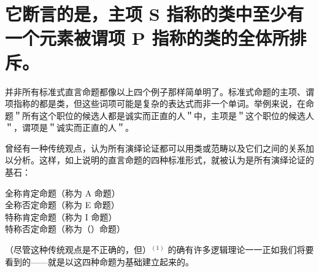 \section*{它断言的是，主项 $\boldsymbol{S}$ 指称的类中至少有一个元素被谓项 $\boldsymbol{P}$ 指称的类的全体所排斥。}
并非所有标准式直言命题都像以上四个例子那样简单明了。标准式命题的主项、谓项指称的都是类，但这些词项可能是复杂的表达式而非一个单词。举例来说，在命题＂所有这个职位的候选人都是诚实而正直的人＂中，主项是＂这个职位的候选人＂，谓项是＂诚实而正直的人＂。

曾经有一种传统观点，认为所有演绎论证都可以用类或范畴以及它们之间的关系加以分析。这样，如上说明的直言命题的四种标准形式，就被认为是所有演绎论证的基石：

\begin{displayquote}
全称肯定命题（称为 A 命题）\\
全称否定命题（称为 E 命题）\\
特称肯定命题（称为 I 命题）\\
特称否定命题（称为（）命题）
\end{displayquote}

（尽管这种传统观点是不正确的，但）${ }^{(1)}$ 的确有许多逻辑理论一一正如我们将要看到的——就是以这四种命题为基础建立起来的。
